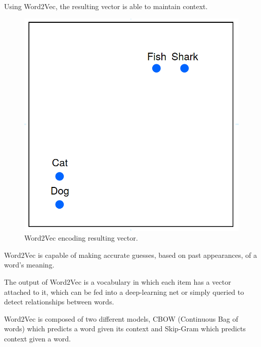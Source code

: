         \par Using Word2Vec, the resulting vector is able to  maintain context.


        \begin{figure}[htb]
            \centering
            \includegraphics[scale = 0.1]{Sections/3StateOfTheArt/3_images/word2vec_encode.png}
            \caption{Word2Vec encoding resulting vector. \cite{word2vec_explained}}
        \end{figure}

        
        \par Word2Vec is capable of making accurate guesses, based on past appearances, of a word's meaning. 

        \par The output of Word2Vec is a vocabulary in which each item has a vector attached to it, which can be fed into a deep-learning net or simply queried to detect relationships between words.

        \par Word2Vec is composed of two different models, CBOW (Continuous Bag of words) which predicts a word given its context and Skip-Gram which predicts context given a word. \cite{Mikolov2013} \cite{Wiki}

        

